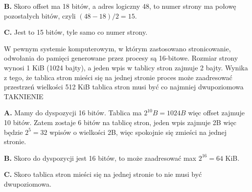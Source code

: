 \begin{solutions}
    \textbf{B.} Skoro offset ma 18 bitów, a adres logiczny 48, to numer strony ma połowę pozostałych bitów, czyli $(48-18)/2=15$.

    \textbf{C.} Jest to 15 bitów, tyle samo co numer strony.

    \sol W pewnym systemie komputerowym, w którym zastosowano stronicowanie, odwołania do pamięci generowane przez procesy są 16-bitowe. Rozmiar strony wynosi 1 KiB (1024 bajty), a jeden wpis w tablicy stron zajmuje 2 bajty. Wynika z tego, że
    \answerss
    {tablica stron mieści się na jednej stronie}
    {proces może zaadresować przestrzeń wielkości 512 KiB}
    {tablica stron musi być co najmniej dwupoziomowa}
    {TAK}{NIE}{NIE}

    \textbf{A.} Mamy do dyspozycji 16 bitów. Tablica ma $2^{10}B = 1024B$ więc offset zajmuje 10 bitów. Zatem zostaje 6 bitów na tablicę stron, jeden wpis zajmuje 2B więc będzie $2^5 = 32$ wpisów o wielkości 2B, więc spokojnie się zmieści na jednej stronie.

    \textbf{}

    \textbf{B.} Skoro do dyspozycji jest 16 bitów, to może zaadresować max $2^{16} = 64$ KiB.

    \textbf{C.} Skoro tablica stron mieści się na jednej stronie to nie musi być dwupoziomowa.
\end{solutions}

